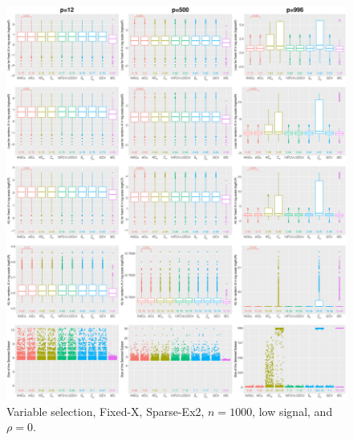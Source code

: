\begin{figure}[!ht]
\centering
\includegraphics[width=\textwidth]{figures/supplement/fixedx/subset_selection/Sparse-Ex2_n1000_lsnr_rho0.eps}
\caption{Variable selection, Fixed-X, Sparse-Ex2, $n=1000$, low signal, and $\rho=0$.}
\end{figure}
\clearpage
